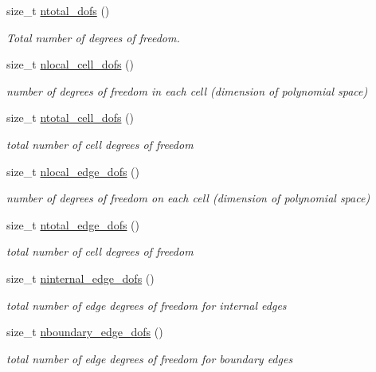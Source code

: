 \begin{DoxyCompactItemize}
size\+\_\+t \hyperlink{group__HybridCore2D_gaea9c9724308071d9cb139e2c841e2374}{ntotal\+\_\+dofs} ()
\begin{DoxyCompactList}\small\item\em Total number of degrees of freedom. \end{DoxyCompactList}\item 
size\+\_\+t \hyperlink{group__HybridCore2D_ga3a24e6ef13ba75d64ecc80f79dab83b9}{nlocal\+\_\+cell\+\_\+dofs} ()
\begin{DoxyCompactList}\small\item\em number of degrees of freedom in each cell (dimension of polynomial space) \end{DoxyCompactList}\item 
size\+\_\+t \hyperlink{group__HybridCore2D_gac820f869ab8cace938669701f9b48aad}{ntotal\+\_\+cell\+\_\+dofs} ()
\begin{DoxyCompactList}\small\item\em total number of cell degrees of freedom \end{DoxyCompactList}\item 
size\+\_\+t \hyperlink{group__HybridCore2D_gace89466bbfe959e8fb8a213e6f34bb62}{nlocal\+\_\+edge\+\_\+dofs} ()
\begin{DoxyCompactList}\small\item\em number of degrees of freedom on each cell (dimension of polynomial space) \end{DoxyCompactList}\item 
size\+\_\+t \hyperlink{group__HybridCore2D_gac6c082a28de96d2a268d1def8da642ea}{ntotal\+\_\+edge\+\_\+dofs} ()
\begin{DoxyCompactList}\small\item\em total number of cell degrees of freedom \end{DoxyCompactList}\item 
size\+\_\+t \hyperlink{group__HybridCore2D_ga6795bd686c3595b121c2cec0e25e7c07}{ninternal\+\_\+edge\+\_\+dofs} ()
\begin{DoxyCompactList}\small\item\em total number of edge degrees of freedom for internal edges \end{DoxyCompactList}\item 
size\+\_\+t \hyperlink{group__HybridCore2D_gab0ed679a15318430e8bc6f75ee104123}{nboundary\+\_\+edge\+\_\+dofs} ()
\begin{DoxyCompactList}\small\item\em total number of edge degrees of freedom for boundary edges \end{DoxyCompactList}\item 

\end{DoxyCompactItemize}
